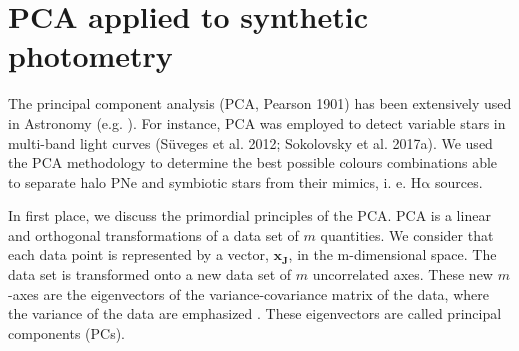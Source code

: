 \documentclass{article}
\newcommand\ha{\ensuremath{\mathrm{H\alpha}}}
\begin{document}



\section{PCA applied to synthetic  photometry}
\label{sec:pca-con}

 The principal component analysis (PCA, Pearson 1901) has been extensively used in Astronomy (e.g. \citealp{Bailer:1998, Karampelas:2012}). For instance, PCA was employed to detect variable stars in multi-band light curves (Süveges et al. 2012; Sokolovsky et al. 2017a). We used the PCA methodology to determine the best possible colours combinations able to separate halo PNe and symbiotic stars from their mimics, i. e. \ha{} sources.
 
In first place, we discuss the primordial principles of the PCA. PCA  is a linear and orthogonal transformations of a data set of \(m\) quantities. We consider that each data point is represented by a vector, \(\mathbf{x_J}\), in the m-dimensional space. The data set is transformed onto a new data set of \(m\) uncorrelated axes. These new \(m\)-axes are the eigenvectors of the variance-covariance matrix of the data, where the variance of the data are emphasized \citep{Moretti:2018}. These eigenvectors are called principal components (PCs).
\end{document}
